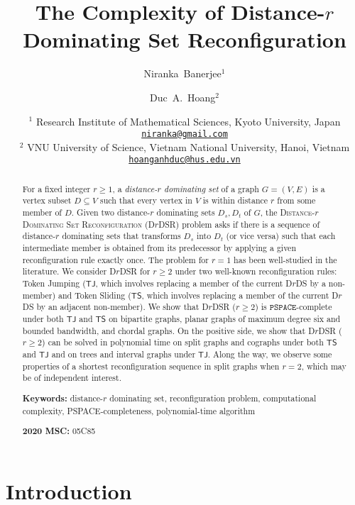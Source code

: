 \documentclass[a4paper]{article}
\title{\textbf{The Complexity of Distance-$r$ Dominating Set Reconfiguration}}
\author{Niranka~Banerjee$^1$ \and Duc~A.~Hoang$^2$}
\date{
	$^1$ Research Institute of Mathematical Sciences, Kyoto University, Japan\\
          \href{mailto:niranka@gmail.com}
          {\texttt{niranka@gmail.com}}\\
        $^2$ VNU University of Science, Vietnam National University, Hanoi, Vietnam\\
	\href{mailto:hoanganhduc@hus.edu.vn}{\texttt{hoanganhduc@hus.edu.vn}}
}
\theoremstyle{plain}
\theoremstyle{definition}
\begin{document}
\maketitle

\begin{abstract}
For a fixed integer $r \geq 1$, a \textit{distance-$r$ dominating set} of a graph $G = (V, E)$ is a vertex subset $D \subseteq V$ such that every vertex in $V$ is within distance $r$ from some member of $D$.
Given two distance-$r$ dominating sets $D_s, D_t$ of $G$, the \textsc{Distance-$r$ Dominating Set Reconfiguration (D$r$DSR)} problem asks if there is a sequence of distance-$r$ dominating sets that transforms $D_s$ into $D_t$ (or vice versa) such that each intermediate member is obtained from its predecessor by applying a given reconfiguration rule exactly once.
The problem for $r = 1$ has been well-studied in the literature.
We consider \textsc{D$r$DSR} for $r \geq 2$ under two well-known reconfiguration rules: Token Jumping ($\mathsf{TJ}$, which involves replacing a member of the current D$r$DS by a non-member) and Token Sliding ($\mathsf{TS}$, which involves replacing a member of the current D$r$DS by an adjacent non-member).
We show that \textsc{D$r$DSR} ($r \geq 2$) is $\mathtt{PSPACE}$-complete under both $\mathsf{TJ}$ and $\mathsf{TS}$ on bipartite graphs, planar graphs of maximum degree six and bounded bandwidth, and chordal graphs.
On the positive side, we show that \textsc{D$r$DSR} ($r \geq 2$) can be solved in polynomial time on split graphs and cographs under both $\mathsf{TS}$ and $\mathsf{TJ}$ and on trees and interval graphs under $\mathsf{TJ}$.
Along the way, we observe some properties of a shortest reconfiguration sequence in split graphs when $r = 2$, which may be of independent interest.

\noindent\textbf{Keywords:} distance-$r$ dominating set, reconfiguration problem, computational complexity, PSPACE-completeness, polynomial-time algorithm

\noindent\textbf{2020 MSC:} 05C85
\end{abstract}

\section{Introduction}
\label{sec:intro}
\end{document}
